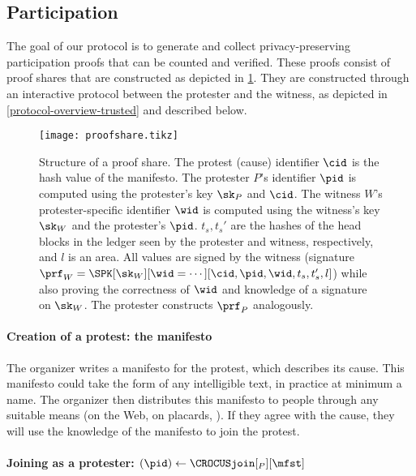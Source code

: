 \subsection{Participation}%
\label{ProtocolDuring}

The goal of our protocol is to generate and collect privacy-preserving
participation proofs that can be counted and verified. These proofs
consist of proof shares that are constructed as depicted in
\cref{fig:ProofFig}.
They are constructed through an interactive protocol between the protester and 
the witness, as depicted in \cref{protocol-overview-trusted} and described below.

\begin{figure}
  \centering
  \small
  \texttt{[image: proofshare.tikz]}
  \caption{%
    Structure of a proof share.
    The protest (cause) identifier \(\cid\) is the hash value of the manifesto.
    The protester \(P\)'s identifier \(\pid\) is computed using the protester's key \(\sk_P\) and \(\cid\).
    The witness \(W\)'s protester-specific identifier \(\wid\) is computed using the
    witness's key \(\sk_W\) and the protester's \(\pid\).
    \(t_s, t_s'\) are the hashes of the head blocks in the ledger seen by the 
    protester and witness, respectively, and \(l\) is an area.
    All values are signed by the witness (signature \(\prf_W = \SPK[\sk_W][\wid 
      = \dotsb][\cid, \pid, \wid, t_s, t_s', l]\)) while also proving the 
    correctness of \(\wid\) and knowledge of a signature on \(\sk_W\).
    The protester constructs \(\prf_P\) analogously.
  }%
  \label{fig:ProofFig}
\end{figure}%


\paragraph*{Creation of a protest: the manifesto}

The organizer writes a manifesto for the protest, which describes its cause.
This manifesto could take the form of any intelligible text, in
practice at minimum a name.
The organizer then distributes this manifesto to people through
any suitable means  (\eg on the Web, on placards, \etc).
If they agree with the cause, they will use the knowledge of the
manifesto to join the protest. 


\paragraph*{Joining as a protester:
  \((\pid)\gets \CROCUSjoin[_P][\mfst]\)}

